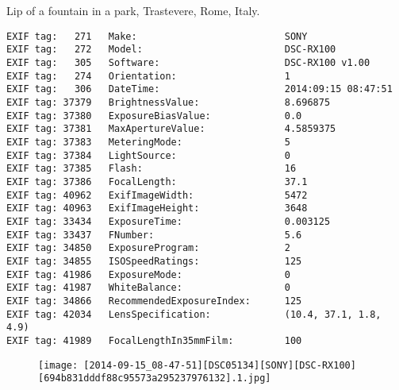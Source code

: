 \section{\protect{}}
\noindent Lip of a fountain in a park, Trastevere, Rome, Italy.
\noindent
\begin{lstlisting}
EXIF tag:   271   Make:                          SONY
EXIF tag:   272   Model:                         DSC-RX100
EXIF tag:   305   Software:                      DSC-RX100 v1.00
EXIF tag:   274   Orientation:                   1
EXIF tag:   306   DateTime:                      2014:09:15 08:47:51
EXIF tag: 37379   BrightnessValue:               8.696875
EXIF tag: 37380   ExposureBiasValue:             0.0
EXIF tag: 37381   MaxApertureValue:              4.5859375
EXIF tag: 37383   MeteringMode:                  5
EXIF tag: 37384   LightSource:                   0
EXIF tag: 37385   Flash:                         16
EXIF tag: 37386   FocalLength:                   37.1
EXIF tag: 40962   ExifImageWidth:                5472
EXIF tag: 40963   ExifImageHeight:               3648
EXIF tag: 33434   ExposureTime:                  0.003125
EXIF tag: 33437   FNumber:                       5.6
EXIF tag: 34850   ExposureProgram:               2
EXIF tag: 34855   ISOSpeedRatings:               125
EXIF tag: 41986   ExposureMode:                  0
EXIF tag: 41987   WhiteBalance:                  0
EXIF tag: 34866   RecommendedExposureIndex:      125
EXIF tag: 42034   LensSpecification:             (10.4, 37.1, 1.8, 4.9)
EXIF tag: 41989   FocalLengthIn35mmFilm:         100

\end{lstlisting}
\clearpage
\begin{figure}
\raggedleft
\texttt{[image: [2014-09-15\_08-47-51][DSC05134][SONY][DSC-RX100][694b831dddf88c95573a295237976132].1.jpg]}
\end{figure}


\clearpage
